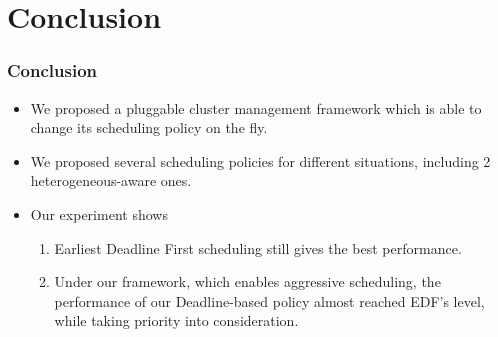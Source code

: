 \section{Conclusion}

\begin{frame}
  \frametitle{Conclusion}
  \begin{itemize}
    \item We proposed a pluggable cluster management framework which is
      able to change its scheduling policy on the fly.
    \item We proposed several scheduling policies for different situations,
      including 2 heterogeneous-aware ones.
    \item Our experiment shows 
      \begin{enumerate}
        \item Earliest Deadline First scheduling still gives the best
          performance.
        \item Under our framework, which enables aggressive scheduling,
          the performance of our Deadline-based policy almost reached
          EDF's level, while taking priority into consideration.
      \end{enumerate}
  \end{itemize}
\end{frame}
